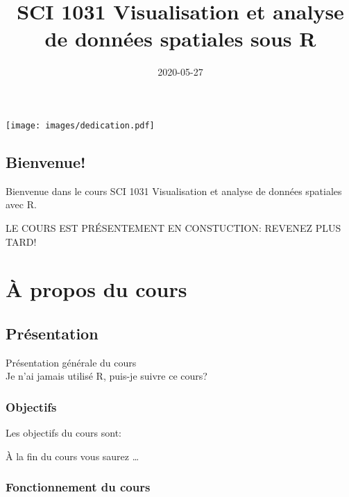 \documentclass[
  12pt,
]{krantz}
\title{SCI 1031 Visualisation et analyse de données spatiales sous R}
\author{}
\date{\vspace{-2.5em}2020-05-27}
\begin{document}
\maketitle

\thispagestyle{empty}
\begin{center}
\texttt{[image: images/dedication.pdf]}
\end{center}

\setlength{\abovedisplayskip}{-5pt}
\setlength{\abovedisplayshortskip}{-5pt}

{
\hypersetup{linkcolor=}
\setcounter{tocdepth}{0}
\tableofcontents
}
\listoftables
\listoffigures
\hypertarget{bienvenue}{%
\chapter*{Bienvenue!}\label{bienvenue}}


Bienvenue dans le cours SCI 1031 Visualisation et analyse de données spatiales avec R.

LE COURS EST PRÉSENTEMENT EN CONSTUCTION: REVENEZ PLUS TARD!

\mainmatter

\hypertarget{part-uxe0-propos-du-cours}{%
\part{À propos du cours}\label{part-uxe0-propos-du-cours}}

\hypertarget{pruxe9sentation}{%
\chapter*{Présentation}\label{pruxe9sentation}}


Présentation générale du cours\\
Je n'ai jamais utilisé R, puis-je suivre ce cours?

\hypertarget{objectifs}{%
\section*{Objectifs}\label{objectifs}}


Les objectifs du cours sont:

À la fin du cours vous saurez \ldots{}

\hypertarget{fonctionnement-du-cours}{%
\section*{Fonctionnement du cours}\label{fonctionnement-du-cours}}
\end{document}
